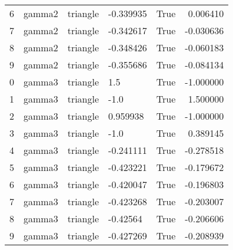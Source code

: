 \begin{tabular}{lllllr}
   6 & gamma2 &   triangle & -0.339935 &  True &  0.006410 \\
   7 & gamma2 &   triangle & -0.342617 &  True & -0.030636 \\
   8 & gamma2 &   triangle & -0.348426 &  True & -0.060183 \\
   9 & gamma2 &   triangle & -0.355686 &  True & -0.084134 \\
   0 & gamma3 &   triangle &       1.5 &  True & -1.000000 \\
   1 & gamma3 &   triangle &      -1.0 &  True &  1.500000 \\
   2 & gamma3 &   triangle &  0.959938 &  True & -1.000000 \\
   3 & gamma3 &   triangle &      -1.0 &  True &  0.389145 \\
   4 & gamma3 &   triangle & -0.241111 &  True & -0.278518 \\
   5 & gamma3 &   triangle & -0.423221 &  True & -0.179672 \\
   6 & gamma3 &   triangle & -0.420047 &  True & -0.196803 \\
   7 & gamma3 &   triangle & -0.423268 &  True & -0.203007 \\
   8 & gamma3 &   triangle &  -0.42564 &  True & -0.206606 \\
   9 & gamma3 &   triangle & -0.427269 &  True & -0.208939 \\
\bottomrule
\end{tabular}
